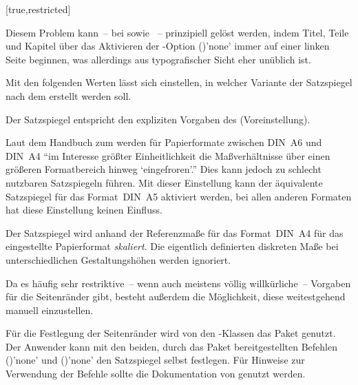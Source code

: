 \begin{Declaration*}{}
\begin{Declaration*}{}
\begin{Declaration*}{}
\begin{Declaration}[%
  v2.03;
  v2.05!\Option{cdgeometry=restricted};%
  v2.05!\Option{cdgeometry=adapted};%
  v2.05!\Option{cdgeometry=calculated};%
  v2.05!\Option{cdgeometry=custom};%
]{}[true,restricted]
\begin{values}{}
  Diesem Problem kann~-- bei  sowie ~-- 
  prinzipiell gelöst werden, indem Titel, Teile und Kapitel über das Aktivieren 
  der \KOMAScript-Option ()'none' immer 
  auf einer linken Seite beginnen, was allerdings aus typografischer Sicht eher 
  unüblich ist.
\end{values}
%
Mit den folgenden Werten lässt sich einstellen, in welcher Variante der 
Satzspiegel nach dem \TUDCD erstellt werden soll. 
%
\begin{values}{}
\item[restricted]
  Der Satzspiegel entspricht den expliziten Vorgaben des \CDs (Voreinstellung).
\item[adapted]
  Laut dem Handbuch zum \CD werden für Papierformate zwischen DIN~A6 und DIN~A4 
  \enquote{im Interesse größter Einheitlichkeit die Maßverhältnisse über einen 
  größeren Formatbereich hinweg \enquote{eingefroren}.} Dies kann jedoch zu 
  schlecht nutzbaren Satzspiegeln führen. Mit dieser Einstellung kann der 
  äquivalente Satzspiegel für das Format~DIN~A5 aktiviert werden, bei allen 
  anderen Formaten hat diese Einstellung keinen Einfluss. 
\item[calculated]
  Der Satzspiegel wird anhand der Referenzmaße für das Format~DIN~A4 für das 
  eingestellte Papierformat \emph{skaliert}. Die eigentlich definierten 
  diskreten Maße bei unterschiedlichen Gestaltungshöhen werden ignoriert.
\end{values}
%
Da es häufig sehr restriktive~-- wenn auch meistens völlig willkürliche~-- 
Vorgaben für die Seitenränder gibt, besteht außerdem die Möglichkeit, diese 
weitestgehend manuell einzustellen. 
\begin{values}{}
\item[custom]
  Für die Festlegung der Seitenränder wird von den \TUDScript-Klassen das 
  Paket  genutzt. Der Anwender kann mit den beiden, durch das 
  Paket bereitgestellten Befehlen ()'none'
  und ()'none' den Satzspiegel selbst 
  festlegen. Für Hinweise zur Verwendung der Befehle sollte die Dokumentation 
  von  genutzt werden.
\end{values}
\end{Declaration}


\end{Declaration*}
\end{Declaration*}
\end{Declaration*}
